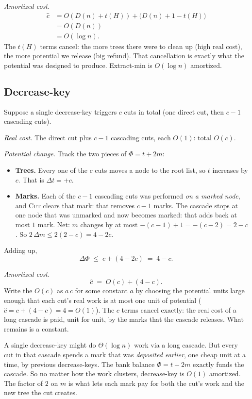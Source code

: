 \emph{Amortized cost.}
\begin{align*}
  \hat{c} &= O(D(n) + t(H)) + \big(D(n) + 1 - t(H)\big) \\
          &= O(D(n)) \\
          &= O(\log n).
\end{align*}
The $t(H)$ terms cancel: the more trees there were to clean up (high real cost),
the more potential we release (big refund). That cancellation is exactly what
the potential was designed to produce. Extract-min is $O(\log n)$ amortized.

\subsection{Decrease-key}
\label{ch20:decrease-key-analysis}

Suppose a single decrease-key triggers $c$ cuts in total
(one direct cut, then $c-1$ cascading cuts).

\emph{Real cost.} The direct cut plus $c-1$ cascading cuts, each $O(1)$: total
$O(c)$.

\emph{Potential change.} Track the two pieces of $\Phi = t + 2m$:
\begin{itemize}
  \item \textbf{Trees.} Every one of the $c$ cuts moves a node to the root list, so
        $t$ increases by $c$. That is $\Delta t = +c$.
  \item \textbf{Marks.} Each of the $c-1$ cascading cuts was performed \emph{on a
        marked node}, and \textsc{Cut} clears that mark: that removes $c-1$ marks.
        The cascade stops at one node that was unmarked and now becomes marked:
        that adds back at most $1$ mark. Net: $m$ changes by at most
        $-(c-1) + 1 = -(c-2) = 2 - c$. So $2\,\Delta m \le 2(2-c) = 4 - 2c$.
\end{itemize}
Adding up,
\[
  \Delta\Phi \;\le\; c + (4 - 2c) \;=\; 4 - c.
\]

\emph{Amortized cost.}
\[
  \hat{c} \;=\; O(c) + (4 - c).
\]
Write the $O(c)$ as $a\,c$ for some constant $a$ by choosing the potential
units large enough that each cut's real work is at most one unit of potential
($\hat c = c + (4-c) = 4 = O(1)$). The $c$ terms cancel exactly: the real cost of a
long cascade is paid, unit for unit, by the marks that the cascade releases. What
remains is a constant.

\begin{focusbox}
A single decrease-key might do
$\Theta(\log n)$ work via a long cascade. But every cut in that cascade spends a
mark that was \emph{deposited earlier}, one cheap unit at a time, by previous
decrease-keys. The bank balance $\Phi = t + 2m$ exactly funds the cascade. So no
matter how the work clusters, decrease-key is $O(1)$ amortized. The factor of $2$
on $m$ is what lets each mark pay for both the cut's work and the new tree the cut
creates.
\end{focusbox}

